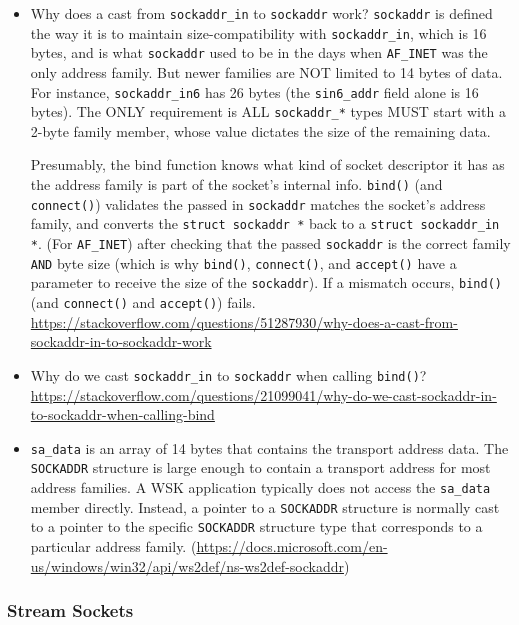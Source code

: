 \begin{itemize}
\item Why does a cast from \texttt{sockaddr\_in} to \texttt{sockaddr} work?
  \texttt{sockaddr} is defined the way it is to maintain size-compatibility with
  \texttt{sockaddr\_in}, which is 16 bytes, and is what \texttt{sockaddr} used to be in
  the days when \texttt{AF\_INET} was the only address family. But newer families are NOT
  limited to 14 bytes of data. For instance, \texttt{sockaddr\_in6} has 26 bytes (the
  \texttt{sin6\_addr} field alone is 16 bytes). The ONLY requirement is ALL
  \texttt{sockaddr\_*} types MUST start with a 2-byte family member, whose value dictates
  the size of the remaining data.

  Presumably, the bind function knows what kind of socket descriptor it has as the address
  family is part of the socket's internal info. \texttt{bind()} (and \texttt{connect()})
  validates the passed in \texttt{sockaddr} matches the socket's address family, and
  converts the \texttt{struct sockaddr *} back to a \texttt{struct sockaddr\_in *}. (For
  \texttt{AF\_INET}) after checking that the passed \texttt{sockaddr} is the correct
  family \texttt{AND} byte size (which is why \texttt{bind()}, \texttt{connect()}, and
  \texttt{accept()} have a parameter to receive the size of the \texttt{sockaddr}). If a
  mismatch occurs, \texttt{bind()} (and \texttt{connect()} and \texttt{accept()}) fails.
  \url{https://stackoverflow.com/questions/51287930/why-does-a-cast-from-sockaddr-in-to-sockaddr-work}
\item Why do we cast \texttt{sockaddr\_in} to \texttt{sockaddr} when calling \texttt{bind()}?  \url{https://stackoverflow.com/questions/21099041/why-do-we-cast-sockaddr-in-to-sockaddr-when-calling-bind}
\item \texttt{sa\_data} is an array of 14 bytes that contains the transport address
  data. The \texttt{SOCKADDR} structure is large enough to contain a transport address for
  most address families. A WSK application typically does not access the \texttt{sa\_data}
  member directly. Instead, a pointer to a \texttt{SOCKADDR} structure is normally cast to
  a pointer to the specific \texttt{SOCKADDR} structure type that corresponds to a
  particular address family.
  (\url{https://docs.microsoft.com/en-us/windows/win32/api/ws2def/ns-ws2def-sockaddr})
\end{itemize}

\subsubsection{Stream Sockets}
\label{sec:stream-sockets}

